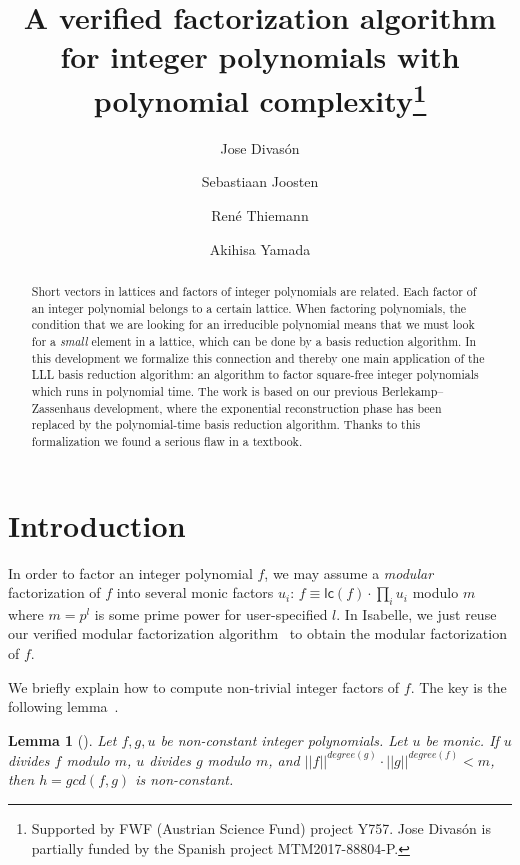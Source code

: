\documentclass[11pt,a4paper]{article}
\newcommand\lc[1]{\mathsf{lc}(#1)}
\newcommand\norm[1]{|\!|#1|\!|}
\newcommand\degree[1]{\mathit{degree}(#1)}
\newtheorem{lemmas}{Lemma}
\renewcommand\gcd{\mathit{gcd}}
\begin{document}
\title{A verified factorization algorithm for integer polynomials with polynomial complexity\footnote{Supported by FWF (Austrian Science Fund) project Y757.
Jose Divas\'on is partially funded by the
Spanish project MTM2017-88804-P.}}
\author{Jose Divas\'on \and
  Sebastiaan Joosten \and
  Ren\'e Thiemann \and
  Akihisa Yamada}
\maketitle


\begin{abstract}
Short vectors in lattices and factors of integer polynomials are related. 
Each factor of an integer polynomial belongs to a certain lattice. 
When factoring polynomials, the condition that we are looking for an irreducible polynomial
means that we must look for a \emph{small} element in a lattice, which can be done by a basis reduction algorithm.
In this development we formalize this connection and thereby one main application of the LLL basis reduction algorithm: an algorithm 
to factor square-free integer polynomials
which runs in polynomial time. The work is based on our previous Berlekamp--Zassenhaus development, where the exponential
reconstruction phase has been replaced by the polynomial-time basis reduction algorithm.
Thanks to this formalization we found a serious flaw in a textbook. 
\end{abstract}

\tableofcontents

\section{Introduction}

In order to factor an integer polynomial $f$, we
may assume a \emph{modular} factorization of $f$ into several monic 
factors $u_i$: $f \equiv \lc f \cdot \prod_i u_i$ modulo $m$ where $m = p^l$ is some prime power for user-specified
$l$. 
In Isabelle, we just reuse our verified modular factorization algorithm~\cite{BZ_CPP17} to obtain the
modular factorization of $f$.

We briefly explain how to compute non-trivial integer factors of $f$. The key is the following lemma~\cite[Lemma~16.20]{MCA}.

\begin{lemmas}[{\cite[Lemma~16.20]{MCA}}]
\label{lemma_16.20}
Let $f,g,u$ be non-constant integer polynomials. Let $u$ be monic.
If $u$ divides $f$ modulo $m$, $u$ divides $g$ modulo $m$, and 
$\norm f^{\degree g} \cdot \norm g^{\degree f} < m$, then $h = \gcd(f,g)$ is non-constant.
\end{lemmas}
\end{document}
